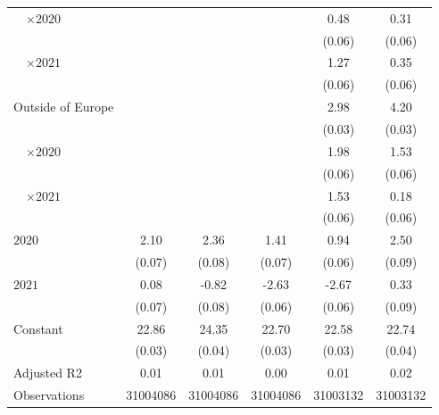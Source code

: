 \begin{tabular}{@{}l*{5}{S[table-format={-}2.2{\tnote{***}}]}@{}}
~~\(\times 2020\) &  &  &  & 0.48\tnote{***} & 0.31\tnote{***}\tabularnewline%
 &  &  &  & (0.06) & \vphantom{3} (0.06)\tabularnewline%
~~\(\times 2021\) &  &  &  & 1.27\tnote{***} & 0.35\tnote{***}\tabularnewline%
 &  &  &  & (0.06) & \vphantom{2} (0.06)\tabularnewline%
Outside of Europe &  &  &  & 2.98\tnote{***} & 4.20\tnote{***}\tabularnewline%
 &  &  &  & (0.03) & (0.03)\tabularnewline%
~~\(\times 2020\) &  &  &  & 1.98\tnote{***} & 1.53\tnote{***}\tabularnewline%
 &  &  &  & (0.06) & \vphantom{1} (0.06)\tabularnewline%
~~\(\times 2021\) &  &  &  & 1.53\tnote{***} & 0.18\tnote{**}\tabularnewline%
 &  &  &  & (0.06) & (0.06)\tabularnewline%
\midrule
\(2020\) & 2.10\tnote{***} & 2.36\tnote{***} & 1.41\tnote{***} & 0.94\tnote{***} & 2.50\tnote{***}\tabularnewline%
 & (0.07) & (0.08) & (0.07) & (0.06) & (0.09)\tabularnewline%
\(2021\) & 0.08 & -0.82\tnote{***} & -2.63\tnote{***} & -2.67\tnote{***} & 0.33\tnote{***}\tabularnewline%
 & (0.07) & (0.08) & (0.06) & (0.06) & (0.09)\tabularnewline%
Constant & 22.86\tnote{***} & 24.35\tnote{***} & 22.70\tnote{***} & 22.58\tnote{***} & 22.74\tnote{***}\tabularnewline%
 & (0.03) & (0.04) & (0.03) & (0.03) & (0.04)\tabularnewline%
\midrule
Adjusted R2 & 0.01 & 0.01 & 0.00 & 0.01 & 0.02\tabularnewline%
Observations & {\num{31004086}} & {\num{31004086}} & {\num{31004086}} & {\num{31003132}} & {\num{31003132}}\tabularnewline%
\bottomrule
\end{tabular}
